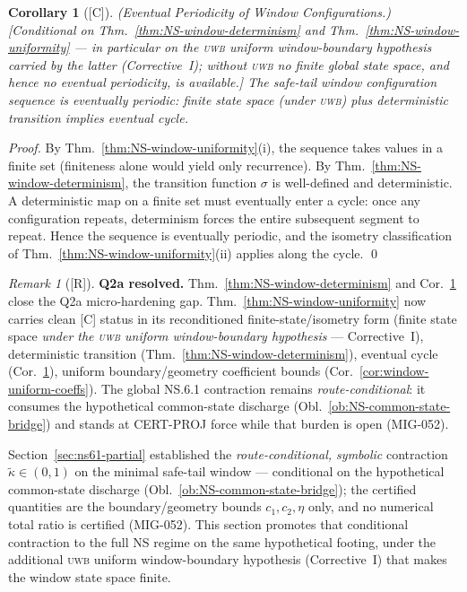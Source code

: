 \documentclass[12pt,oneside]{amsbook}
\theoremstyle{plain}
\newtheorem{corollary}[theorem]{Corollary}
\theoremstyle{definition}
\theoremstyle{remark}
\newtheorem{remark}[theorem]{Remark}
\newcommand{\status}[1]{\textup{[#1]}}
\begin{document}
\begin{corollary}[\status{C}]\label{cor:NS-eventual-periodicity}
\textup{(Eventual Periodicity of Window Configurations.)}
\textup{[Conditional on Thm.~\ref{thm:NS-window-determinism} and
Thm.~\ref{thm:NS-window-uniformity} --- in particular on the
\textsc{uwb} uniform window-boundary hypothesis carried by the
latter (Corrective~I); without \textsc{uwb} no finite global state
space, and hence no eventual periodicity, is available.]}
The safe-tail window configuration sequence is eventually periodic:
finite state space (under \textsc{uwb}) plus deterministic
transition implies eventual cycle.
\end{corollary}

\begin{proof}
By Thm.~\ref{thm:NS-window-uniformity}(i), the sequence takes
values in a finite set (finiteness alone would yield only
recurrence). By Thm.~\ref{thm:NS-window-determinism}, the
transition function $\sigma$ is well-defined and deterministic. A
deterministic map on a finite set must eventually enter a cycle:
once any configuration repeats, determinism forces the entire
subsequent segment to repeat. Hence the sequence is eventually
periodic, and the isometry classification of
Thm.~\ref{thm:NS-window-uniformity}(ii) applies along the cycle.
\qed
\end{proof}

\begin{remark}[\status{R}]\label{rem:NS-Q2a-resolved}
\textbf{Q2a resolved.}
Thm.~\ref{thm:NS-window-determinism} and
Cor.~\ref{cor:NS-eventual-periodicity} close the Q2a micro-hardening
gap. Thm.~\ref{thm:NS-window-uniformity} now carries clean [C] status
in its reconditioned finite-state/isometry form (finite state
space \emph{under the \textsc{uwb} uniform window-boundary
hypothesis} --- Corrective~I), deterministic transition
(Thm.~\ref{thm:NS-window-determinism}), eventual cycle
(Cor.~\ref{cor:NS-eventual-periodicity}), uniform
boundary/geometry coefficient bounds
(Cor.~\ref{cor:window-uniform-coeffs}). The global NS.6.1
contraction remains \emph{route-conditional}: it consumes the
hypothetical common-state discharge
(Obl.~\ref{ob:NS-common-state-bridge}) and stands at CERT-PROJ
force while that burden is open (MIG-052).
\end{remark}


\label{sec:ns61-global}

Section~\ref{sec:ns61-partial} established the
\emph{route-conditional, symbolic} contraction
$\widetilde\kappa \in (0,1)$ on the minimal safe-tail window ---
conditional on the hypothetical common-state discharge
(Obl.~\ref{ob:NS-common-state-bridge}); the certified quantities
are the boundary/geometry bounds $c_1, c_2, \eta$ only, and no
numerical total ratio is certified (MIG-052). This section
promotes that conditional contraction to the full NS regime on the
same hypothetical footing, under the additional \textsc{uwb}
uniform window-boundary hypothesis (Corrective~I) that makes the
window state space finite.
\end{document}
